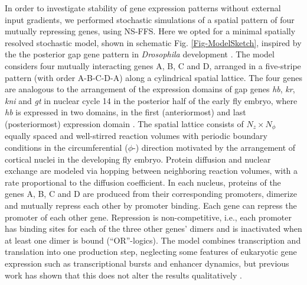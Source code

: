 \documentclass[a4paper,10pt]{article}
\newcommand{\Drosophila}{{\it Drosophila}\xspace}
\newcommand{\hb}{{\it hb}\xspace}
\newcommand{\kr}{{\it kr}\xspace}
\newcommand{\kni}{{\it kni}\xspace}
\newcommand{\gt}{{\it gt}\xspace}
\newcommand{\GA}{A\xspace}
\newcommand{\GB}{B\xspace}
\newcommand{\GC}{C\xspace}
\newcommand{\GD}{D\xspace}
\begin{document}
In order to investigate stability of gene expression patterns without external input gradients, we performed stochastic simulations of a spatial pattern of four mutually repressing genes, using NS-FFS.
Here we opted for a minimal spatially resolved stochastic model, shown in schematic Fig. \ref{Fig-ModelSketch}, inspired by the the posterior gap gene pattern in \Drosophila development \cite{Jaeger2004}. The model considers four mutually interacting genes \GA, \GB, \GC and \GD, arranged in a five-stripe pattern (with order \GA-\GB-\GC-\GD-\GA) along a cylindrical spatial lattice. The four genes are analogous to the arrangement of the expression domains 
of gap genes \hb, \kr, \kni and \gt in nuclear cycle 14 in the posterior half of the early fly embryo, where \hb is expressed in two domains, in the first (anteriormost) and last (posteriormost) expression domain \cite{Jaeger2004, Jaeger2011, Dubuis2013, Manu2009PlosBiol, Surkova2008, Clyde2003}.
The spatial lattice consists of $N_z\times N_\phi$ equally spaced and well-stirred reaction volumes with periodic boundary conditions in the circumferential ($\phi$-) direction motivated by the arrangement of cortical nuclei in the developing fly embryo.
Protein diffusion and nuclear exchange are modeled via hopping between neighboring reaction volumes, with a rate proportional to the diffusion coefficient.
In each nucleus, proteins of the genes \GA, \GB, \GC and \GD are produced from their corresponding promoters, dimerize and mutually repress each other by promoter binding.
Each gene can repress the promoter of each other gene. %
Repression is non-competitive, i.e., each promoter has binding sites for each of the three other genes' dimers and is inactivated when at least one dimer is bound (``OR''-logics).
The model combines transcription and translation into one production step, neglecting some features of eukaryotic gene expression such as transcriptional bursts and enhancer dynamics, but previous work has shown that this does not alter the results qualitatively \cite{Erdmann2009,Sokolowski2012}.
\end{document}
